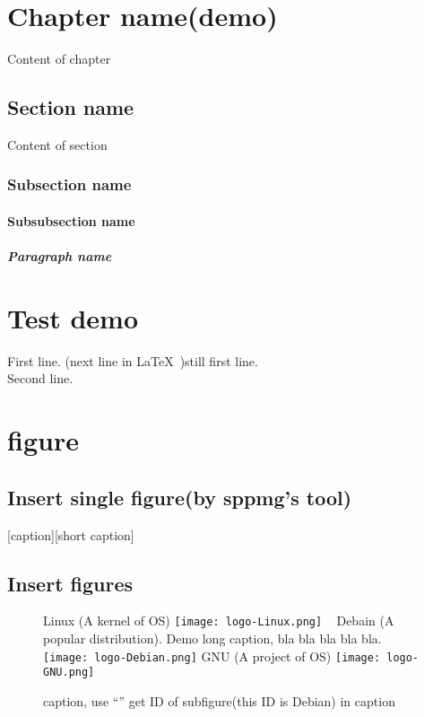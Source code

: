 \documentclass[class=NCU_thesis_en, crop=false]{standalone}
\begin{document}
\chapter{Chapter name(demo)}
Content of chapter
\section{Section name}
Content of section
\subsection{Subsection name}
\subsubsection{Subsubsection name}
\paragraph{Paragraph name}


\chapter{Test demo}
First line.
(next line in \LaTeX\ )still first line. \\
Second line.


\chapter{figure}
\section{Insert single figure(by sppmg's tool)}
[caption][short caption]

\section{Insert figures}
\begin{figure}[!hbt]
    \centering
    \subcaptionbox
        {Linux (A kernel of OS)
        \label{fig:subfig_linux}}
        {\texttt{[image: logo-Linux.png]}}
    ~
    \subcaptionbox
        {Debain (A popular distribution). Demo long caption,  bla bla bla bla bla.
        \label{fig:subfig_debian}}
        {\texttt{[image: logo-Debian.png]}}
    \vspace{\baselineskip} %
    \subcaptionbox
        {GNU (A project of OS)
        \label{fig:subfig_gnu}}
        {\texttt{[image: logo-GNU.png]}}
    \caption{caption, use ``'' get ID of subfigure(this ID is Debian) in caption}
    \label{fig:labal}
\end{figure}
\end{document}
